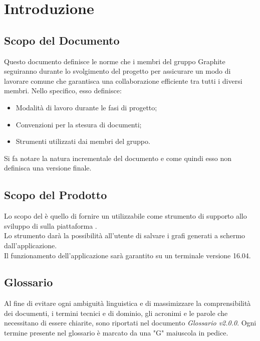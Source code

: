 \documentclass[./NormediProgetto.tex]{subfiles}
\begin{document}
	
\chapter{Introduzione}

\section{Scopo del Documento}

Questo documento definisce le norme che i membri del gruppo Graphite seguiranno durante lo svolgimento del progetto per assicurare un modo di lavorare comune che garantisca una collaborazione efficiente tra tutti i diversi
membri. Nello specifico, esso definisce:

\begin{itemize}
	\item Modalità di lavoro durante le fasi di progetto;
	\item Convenzioni per la stesura di documenti;
	\item Strumenti utilizzati dai membri del gruppo.
\end{itemize}
Si fa notare la natura incrementale del documento e come quindi esso non definisca una versione finale.
\section{Scopo del Prodotto}

Lo scopo del  è quello di fornire un  utilizzabile come strumento di supporto allo sviluppo di  sulla piattaforma . 
\\ \noindent Lo strumento darà la possibilità all'utente di salvare i grafi generati a schermo dall'applicazione.
\\ \noindent Il funzionamento dell'applicazione sarà garantito su un terminale  versione 16.04.

\section{Glossario}

Al fine di evitare ogni ambiguità linguistica e di massimizzare la comprensibilità dei documenti, i termini tecnici e di dominio, gli acronimi e le parole che necessitano di essere chiarite, sono riportati nel documento \textit{Glossario v2.0.0}.
Ogni termine presente nel glossario è marcato da una "G" maiuscola in pedice.
\end{document}
